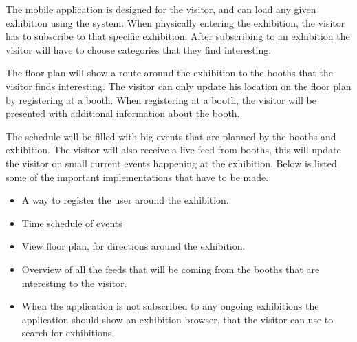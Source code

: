 The mobile application is designed for the visitor, and can load any given exhibition using the system. When physically entering the exhibition, the visitor has to subscribe to that specific exhibition. After subscribing to an exhibition the visitor will have to choose categories that they find interesting. 

The floor plan will show a route around the exhibition to the booths that the visitor finds interesting. The visitor can only update his location on the floor plan by registering at a booth. When registering at a booth, the visitor will be presented with additional information about the booth. 

The schedule will be filled with big events that are planned by the booths and exhibition. The visitor will also receive a live feed from booths, this will update the visitor on small current events happening at the exhibition. Below is listed some of the important implementations that have to be made.
\begin{itemize}
\item A way to register the user around the exhibition.
\item Time schedule of events
\item View floor plan, for directions around the exhibition.
\item Overview of all the feeds that will be coming from the booths that are interesting to the visitor.
\item When the application is not subscribed to any ongoing exhibitions the application should show an exhibition browser, that the visitor can use to search for exhibitions.
\end{itemize}